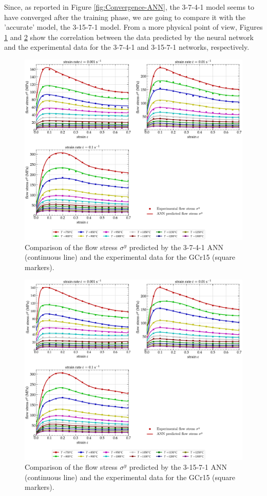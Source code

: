 \documentclass[algorithms,article,submit,pdftex,moreauthors]{Definitions/mdpi}
\begin{document}
Since, as reported in Figure \ref{fig:Convergence-ANN}, the 3-7-4-1 model seems to have converged after the training phase, we are going to compare it with the 'accurate' model, the 3-15-7-1 model.
From a more physical point of view, Figures \ref{fig:CompExpANN-9-4} and \ref{fig:CompExpANN-15-7} show the correlation between the data predicted by the neural network and the experimental data for the 3-7-4-1 and 3-15-7-1 networks, respectively.
\begin{figure}[!ht]
\centering
\includegraphics[width=\columnwidth]{Figures/CompExpANN-3-7-4-1}
\caption{Comparison of the flow stress $\sigma^y$ predicted by the 3-7-4-1 ANN (continuous line) and the experimental data for the GCr15 (square markers).}
\label{fig:CompExpANN-9-4}
\end{figure}
\begin{figure}[!ht]
\centering
\includegraphics[width=\columnwidth]{Figures/CompExpANN-3-15-7-1}
\caption{Comparison of the flow stress $\sigma^y$ predicted by the 3-15-7-1 ANN (continuous line) and the experimental data for the GCr15 (square markers).}
\label{fig:CompExpANN-15-7}
\end{figure}
\end{document}
